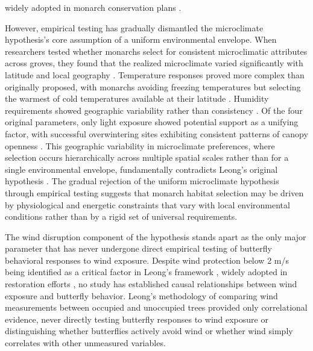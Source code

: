 widely adopted in monarch conservation plans \citep{xercessocietyStateMonarchOverwintering2016,jepsenProtectingCaliforniasButterfly2017,peltonMonarchButterflyOverwintering2020,weissRecommendationsRestorationMonarch2008,althouse&meadeinc.EllwoodMesaSperling2023}.

However, empirical testing has gradually dismantled the microclimate hypothesis's core assumption of a uniform environmental envelope. When researchers tested whether monarchs select for consistent microclimatic attributes across groves, they found that the realized microclimate varied significantly with latitude and local geography \citep{sanieeHierarchyScaleInfluence2022}. Temperature responses proved more complex than originally proposed, with monarchs avoiding freezing temperatures but selecting the warmest of cold temperatures available at their latitude \citep{fisherClimaticNicheModel2018}. Humidity requirements showed geographic variability rather than consistency \citep{sanieeHierarchyScaleInfluence2022}. Of the four original parameters, only light exposure showed potential support as a unifying factor, with successful overwintering sites exhibiting consistent patterns of canopy openness \citep{sanieeHierarchyScaleInfluence2022,weissForestCanopyStructure1991}. This geographic variability in microclimate preferences, where selection occurs hierarchically across multiple spatial scales rather than for a single environmental envelope, fundamentally contradicts Leong's original hypothesis \citep{fisherClimaticNicheModel2018,sanieeHierarchyScaleInfluence2022}. The gradual rejection of the uniform microclimate hypothesis through empirical testing suggests that monarch habitat selection may be driven by physiological and energetic constraints that vary with local environmental conditions rather than by a rigid set of universal requirements.

The wind disruption component of the hypothesis stands apart as the only major parameter that has never undergone direct empirical testing of butterfly behavioral responses to wind exposure. Despite wind protection below 2 m/s being identified as a critical factor in Leong's framework \citep{leongEvaluationManagementCalifornia2016}, widely adopted in restoration efforts \citep{xercessocietyManagingMonarchsWest2018,jepsenProtectingCaliforniasButterfly2017,althouse&meadeinc.EllwoodMesaSperling2023,u.s.fishandwildlifeserviceMonarchDanausPlexippus2024,weissAlbanyHillMonarch2018}, no study has established causal relationships between wind exposure and butterfly behavior. Leong's methodology of comparing wind measurements between occupied and unoccupied trees provided only correlational evidence, never directly testing butterfly responses to wind exposure or distinguishing whether butterflies actively avoid wind or whether wind simply correlates with other unmeasured variables.

